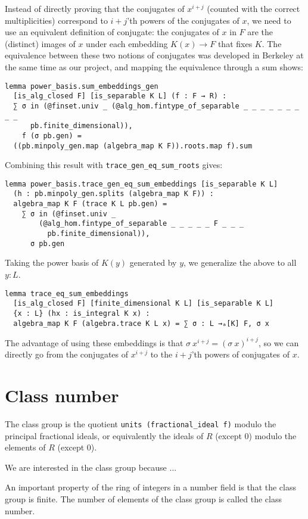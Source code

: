 \documentclass[a4paper,USenglish,cleveref, autoref, thm-restate]{lipics-v2021}
\newcommand{\lean}[1]{\texttt{#1}\xspace} %
\begin{document}
Instead of directly proving that the conjugates of $x^{i + j}$ (counted with the correct multiplicities) correspond to $i + j$'th powers of the conjugates of $x$,
we need to use an equivalent definition of conjugate:
the conjugates of $x$ in $F$ are the (distinct) images of $x$ under each embedding $K(x) \to F$ that fixes $K$.
The equivalence between these two notions of conjugates was developed in Berkeley at the same time as our project, and mapping the equivalence through a sum shows: %
\begin{lstlisting}
lemma power_basis.sum_embeddings_gen
  [is_alg_closed F] [is_separable K L] (f : F → R) :
  ∑ σ in (@finset.univ _ (@alg_hom.fintype_of_separable _ _ _ _ _ _ _ _ _
      pb.finite_dimensional)),
    f (σ pb.gen) =
  ((pb.minpoly_gen.map (algebra_map K F)).roots.map f).sum
\end{lstlisting}
Combining this result with \lean{trace\_gen\_eq\_sum\_roots} gives:
\begin{lstlisting}
lemma power_basis.trace_gen_eq_sum_embeddings [is_separable K L]
  (h : pb.minpoly_gen.splits (algebra_map K F)) :
  algebra_map K F (trace K L pb.gen) =
    ∑ σ in (@finset.univ _
        (@alg_hom.fintype_of_separable _ _ _ _ _ F _ _ _
          pb.finite_dimensional)),
      σ pb.gen
\end{lstlisting}
Taking the power basis of $K(y)$ generated by $y$, we generalize the above to all $y : L$.
\begin{lstlisting}
lemma trace_eq_sum_embeddings
  [is_alg_closed F] [finite_dimensional K L] [is_separable K L]
  {x : L} (hx : is_integral K x) :
  algebra_map K F (algebra.trace K L x) = ∑ σ : L →ₐ[K] F, σ x
\end{lstlisting}
The advantage of using these embeddings is that $\sigma\ x^{i + j} = (\sigma\ x)^{i + j}$,
so we can directly go from the conjugates of $x^{i + j}$ to the $i + j$'th powers of conjugates of $x$.

\section{Class number}

The class group is the quotient \lean{units (fractional\_ideal f)} modulo the principal fractional ideals, or equivalently the ideals of $R$ (except $0$) modulo the elements of $R$ (except $0$).

We are interested in the class group because ...

An important property of the ring of integers in a number field is that the class group is finite. The number of elements of the class group is called the class number.
\end{document}
